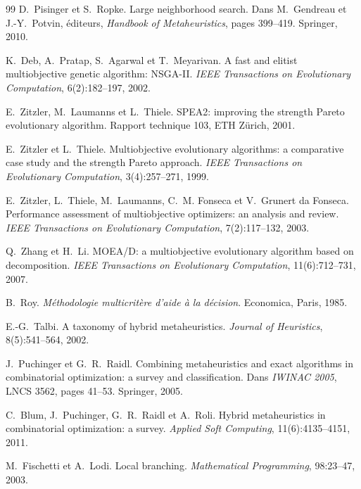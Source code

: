 \documentclass[11pt,a4paper]{article}
\theoremstyle{plain}
\theoremstyle{remark}
\begin{document}
\begin{thebibliography}{99}
D.~Pisinger et S.~Ropke.
\newblock Large neighborhood search.
\newblock Dans M.~Gendreau et J.-Y.~Potvin, éditeurs, \emph{Handbook of
  Metaheuristics}, pages 399--419. Springer, 2010.

K.~Deb, A.~Pratap, S.~Agarwal et T.~Meyarivan.
\newblock A fast and elitist multiobjective genetic algorithm: NSGA-II.
\newblock \emph{IEEE Transactions on Evolutionary Computation},
  6(2):182--197, 2002.

E.~Zitzler, M.~Laumanns et L.~Thiele.
\newblock SPEA2: improving the strength Pareto evolutionary algorithm.
\newblock Rapport technique 103, ETH Zürich, 2001.

E.~Zitzler et L.~Thiele.
\newblock Multiobjective evolutionary algorithms: a comparative case study and
  the strength Pareto approach.
\newblock \emph{IEEE Transactions on Evolutionary Computation},
  3(4):257--271, 1999.

E.~Zitzler, L.~Thiele, M.~Laumanns, C.~M. Fonseca et
  V.~Grunert da Fonseca.
\newblock Performance assessment of multiobjective optimizers: an analysis and
  review.
\newblock \emph{IEEE Transactions on Evolutionary Computation},
  7(2):117--132, 2003.

Q.~Zhang et H.~Li.
\newblock MOEA/D: a multiobjective evolutionary algorithm based on
  decomposition.
\newblock \emph{IEEE Transactions on Evolutionary Computation},
  11(6):712--731, 2007.

B.~Roy.
\newblock \emph{Méthodologie multicritère d'aide à la décision}.
\newblock Economica, Paris, 1985.

E.-G.~Talbi.
\newblock A taxonomy of hybrid metaheuristics.
\newblock \emph{Journal of Heuristics}, 8(5):541--564, 2002.

J.~Puchinger et G.~R.~Raidl.
\newblock Combining metaheuristics and exact algorithms in combinatorial
  optimization: a survey and classification.
\newblock Dans \emph{IWINAC 2005}, LNCS 3562, pages 41--53. Springer, 2005.

C.~Blum, J.~Puchinger, G.~R.~Raidl et A.~Roli.
\newblock Hybrid metaheuristics in combinatorial optimization: a survey.
\newblock \emph{Applied Soft Computing}, 11(6):4135--4151, 2011.

M.~Fischetti et A.~Lodi.
\newblock Local branching.
\newblock \emph{Mathematical Programming}, 98:23--47, 2003.


\end{thebibliography}
\end{document}
